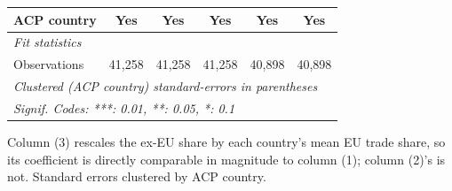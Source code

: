 \begin{tabular}{lccccc}
   ACP country                   & Yes            & Yes                              & Yes                               & Yes                                & Yes\\  
   \midrule
   \emph{Fit statistics}\\
   Observations                  & 41,258         & 41,258                           & 41,258                            & 40,898                             & 40,898\\  
   \midrule \midrule
   \multicolumn{6}{l}{\emph{Clustered (ACP country) standard-errors in parentheses}}\\
   \multicolumn{6}{l}{\emph{Signif. Codes: ***: 0.01, **: 0.05, *: 0.1}}\\
\end{tabular}
 
\par \raggedright 
Column (3) rescales the ex-EU share by each country's mean EU trade share, so its coefficient is directly comparable in magnitude to column (1); column (2)'s is not. Standard errors clustered by ACP country.
\par\endgroup


